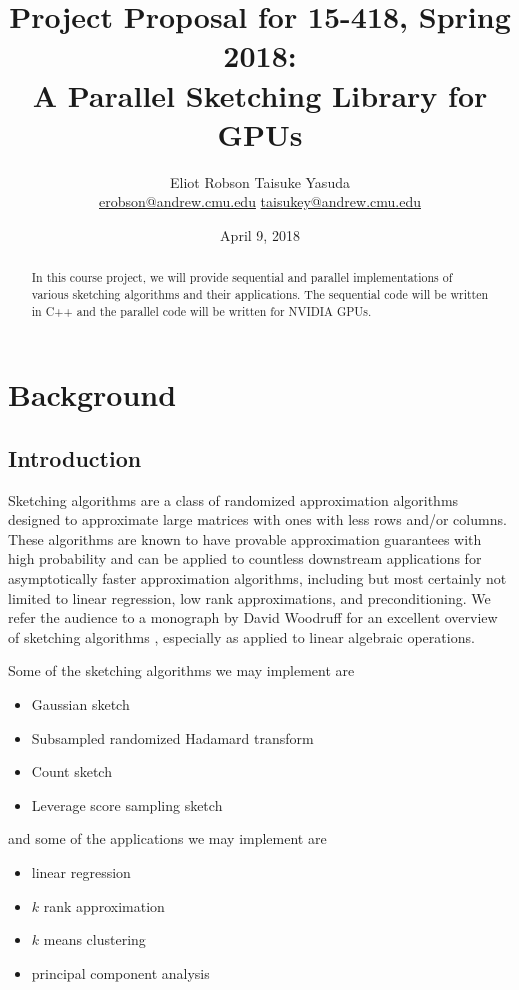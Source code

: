 \documentclass[12pt]{article}
\begin{document}
\title{
    \normalsize Project Proposal for 15-418, Spring 2018: \\
    \LARGE A Parallel Sketching Library for GPUs
}
\author{Eliot Robson \qquad Taisuke Yasuda\\ \small
\href{mailto:erobson@andrew.cmu.edu}{erobson@andrew.cmu.edu} \quad \href{mailto:taisukey@andrew.cmu.edu}{taisukey@andrew.cmu.edu}}
\date{April 9, 2018}

\maketitle

\begin{abstract}
	In this course project, we will provide sequential and parallel implementations of various sketching algorithms and their applications. The sequential code will be written in C++ and the parallel code will be written for NVIDIA GPUs. 
\end{abstract}

\section{Background}

\subsection{Introduction}
Sketching algorithms are a class of randomized approximation algorithms designed to approximate large matrices with ones with less rows and/or columns. These algorithms are known to have provable approximation guarantees with high probability and can be applied to countless downstream applications for asymptotically faster approximation algorithms, including but most certainly not limited to linear regression, low rank approximations, and preconditioning. We refer the audience to a monograph by David Woodruff for an excellent overview of sketching algorithms \cite{woodruff2014sketching}, especially as applied to linear algebraic operations.

Some of the sketching algorithms we may implement are
\begin{itemize}
	\item Gaussian sketch
	\item Subsampled randomized Hadamard transform
	\item Count sketch
	\item Leverage score sampling sketch
\end{itemize}
and some of the applications we may implement are
\begin{itemize}
	\item linear regression
	\item $k$ rank approximation
	\item $k$ means clustering
	\item principal component analysis
\end{itemize}
\end{document}
